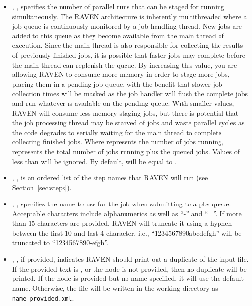 \begin{itemize}
\item {}, ,
  specifies the number of parallel runs that can be staged for running
  simultaneously.
  The RAVEN architecture is inherently multithreaded where a job queue is
  continuously monitored by a job handling thread.
  New jobs are added to this queue as they become available from the main thread
  of execution.
  Since the main thread is also responsible for collecting the results of
  previously finished jobs, it is possible that faster jobs may complete before
  the main thread can replenish the queue.
  By increasing this value, you are allowing RAVEN to consume more memory 
  in order to stage more jobs, placing them in a pending job queue, with the
  benefit that slower job collection times will be masked as the job handler
  will flush the complete jobs and run whatever is available on the pending
  queue.
  With smaller values, RAVEN will consume less memory staging jobs, but there is
  potential that the job processing thread may be starved of jobs and waste
  parallel cycles as the code degrades to serially waiting for the main thread
  to complete collecting finished jobs.
  Where  represents the number of jobs running,
   represents the total number of jobs running plus the
  queued jobs. Values of  less than 
  will be ignored. By default,  will be equal to
  .

\item {}, , is
an ordered list of the step names that RAVEN will run (see
Section~\ref{sec:steps}).

\item {}, , specifies
the name to use for the job when submitting to a pbs queue.  Acceptable characters
include alphanumerics as well as ``-'' and ``\_''.  If more than 15
characters are provided, RAVEN will truncate it using a hyphen between the first
10 and last 4 character, i.e., ``1234567890abcdefgh'' will be truncated to
``1234567890-efgh''.
%

\item {}, , if provided, indicates RAVEN should print out a
  duplicate of the input file.  If the provided text is , or the node is not provided, then
  no duplicate will be printed.  If the node is provided but no name specified, it will use the default name.
  Otherwise, the file will be written in the working directory as \texttt{name\_provided.xml}.
%


\end{itemize}
